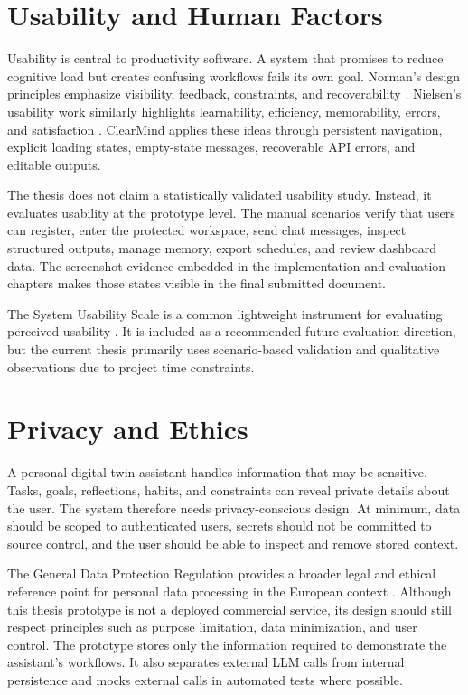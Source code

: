 \section{Usability and Human Factors}

Usability is central to productivity software. A system that promises to reduce cognitive load but creates confusing workflows fails its own goal. Norman's design principles emphasize visibility, feedback, constraints, and recoverability \cite{norman2013design}. Nielsen's usability work similarly highlights learnability, efficiency, memorability, errors, and satisfaction \cite{nielsen1994usability}. ClearMind applies these ideas through persistent navigation, explicit loading states, empty-state messages, recoverable API errors, and editable outputs.

The thesis does not claim a statistically validated usability study. Instead, it evaluates usability at the prototype level. The manual scenarios verify that users can register, enter the protected workspace, send chat messages, inspect structured outputs, manage memory, export schedules, and review dashboard data. The screenshot evidence embedded in the implementation and evaluation chapters makes those states visible in the final submitted document.

The System Usability Scale is a common lightweight instrument for evaluating perceived usability \cite{brooke1996sus}. It is included as a recommended future evaluation direction, but the current thesis primarily uses scenario-based validation and qualitative observations due to project time constraints.

\section{Privacy and Ethics}

A personal digital twin assistant handles information that may be sensitive. Tasks, goals, reflections, habits, and constraints can reveal private details about the user. The system therefore needs privacy-conscious design. At minimum, data should be scoped to authenticated users, secrets should not be committed to source control, and the user should be able to inspect and remove stored context.

The General Data Protection Regulation provides a broader legal and ethical reference point for personal data processing in the European context \cite{gdpr}. Although this thesis prototype is not a deployed commercial service, its design should still respect principles such as purpose limitation, data minimization, and user control. The prototype stores only the information required to demonstrate the assistant's workflows. It also separates external LLM calls from internal persistence and mocks external calls in automated tests where possible.

